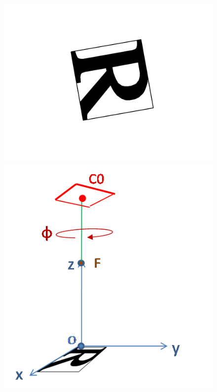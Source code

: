\begin{figure}
{		{\includegraphics[scale=0.24]{vue_fps_rotation_phi.png}}
		{\includegraphics[scale=0.35]{vue_tps_rotation_phi.png}}}
\end{figure}
